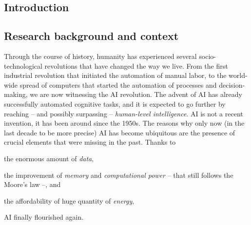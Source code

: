 
\begin{refsection}

\minitoc
\chapter{Introduction}
\label{ch:introduction}
\mtcaddchapter
\minitoc

\section{Research background and context}
\label{sec:research-background-and-context}
%
Through the course of history, humanity has experienced several socio-technological revolutions that have changed the way we live.
%
From the first industrial revolution that initiated the automation of manual labor, to the world-wide spread of computers that started the automation of processes and decision-making, we are now witnessing the \gls{AI} revolution.
%
The advent of \gls{AI} has already successfully automated cognitive tasks, and it is expected to go further by reaching -- and possibly surpassing -- \emph{human-level intelligence}.
%
\Gls{AI} is not a recent invention, it has been around since the 1950s.
%
The reasons why only now (in the last decade to be more precise) \gls{AI} has become ubiquitous are the presence of crucial elements that were missing in the past.
%
Thanks to
%
\begin{inlinelist}
    \item the enormous amount of \emph{data},
    \item the improvement of \emph{memory} and \emph{computational power} -- that still follows the Moore's law --, and
    \item the affordability of huge quantity of \emph{energy},
\end{inlinelist}
%
\gls{AI} finally flourished again.



\end{refsection}
